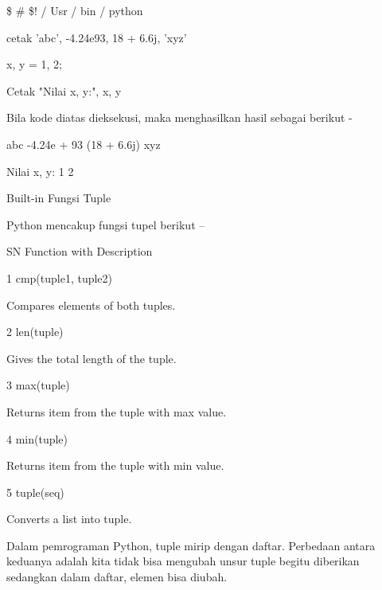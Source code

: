  \$  \#  \$! / Usr / bin / python \par
\vspace{12pt}
cetak 'abc', -4.24e93, 18 + 6.6j, 'xyz' \par
x, y = 1, 2; \par
Cetak "Nilai x, y:", x, y \par
Bila kode diatas dieksekusi, maka menghasilkan hasil sebagai berikut - \par
abc -4.24e + 93 (18 + 6.6j) xyz \par
Nilai x, y: 1 2 \par
Built-in Fungsi Tuple \par
Python mencakup fungsi tupel berikut – \par
\vspace{12pt}
\vspace{12pt}
\vspace{12pt}
SN \hspace*{0.5in} Function with Description \par
1 \hspace*{0.5in} cmp(tuple1, tuple2) \par
\vspace{12pt}
Compares elements of both tuples. \par
2 \hspace*{0.5in} len(tuple) \par
\vspace{12pt}
Gives the total length of the tuple. \par
3 \hspace*{0.5in} max(tuple) \par
\vspace{12pt}
Returns item from the tuple with max value. \par
4 \hspace*{0.5in} min(tuple) \par
\vspace{12pt}
Returns item from the tuple with min value. \par
5 \hspace*{0.5in} tuple(seq) \par
\vspace{12pt}
Converts a list into tuple. \par
\vspace{12pt}
\vspace{12pt}
\vspace{12pt}
\vspace{12pt}
\vspace{12pt}
Dalam pemrograman Python, tuple mirip dengan daftar. Perbedaan antara keduanya adalah kita tidak bisa mengubah unsur tuple begitu diberikan sedangkan dalam daftar, elemen bisa diubah. \par
